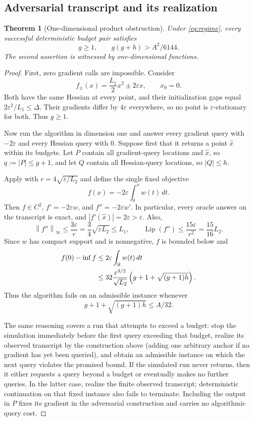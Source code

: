 \documentclass[11pt]{article}
\newtheorem{theorem}{Theorem}[section]
\theoremstyle{remark}
\theoremstyle{remark}
\newcommand{\R}{\mathbb R}
\newcommand{\eps}{\varepsilon}
\newcommand{\norm}[1]{\left\lVert#1\right\rVert}
\newcommand{\Lip}{\operatorname{Lip}}
\begin{document}
\subsection{Adversarial transcript and its realization}
\begin{theorem}[One-dimensional product obstruction]\label{thm:lower}
Under \eqref{eq:regime}, every successful deterministic budget pair satisfies
\[
 g\ge1,\qquad g(g+h)>A^2/6144.
\]
The second assertion is witnessed by one-dimensional functions.
\end{theorem}
\begin{proof}
First, zero gradient calls are impossible. Consider
\[
 f_\pm(x)=\frac{L_1}{2}x^2\pm2\eps x,\qquad x_0=0.
\]
Both have the same Hessian at every point, and their initialization gaps equal $2\eps^2/L_1\le\Delta$. Their gradients differ by $4\eps$ everywhere, so no point is $\eps$-stationary for both. Thus $g\ge1$.

Now run the algorithm in dimension one and answer every gradient query with $-2\eps$ and every Hessian query with $0$. Suppose first that it returns a point $\hat x$ within its budgets. Let $P$ contain all gradient-query locations and $\hat x$, so $q:=|P|\le g+1$, and let $Q$ contain all Hessian-query locations, so $|Q|\le h$.

Apply  with $r=4\sqrt{\eps/L_2}$ and define the single fixed objective
\begin{equation}\label{eq:hard-objective}
 f(x)=-2\eps\int_0^x w(t)\,dt.
\end{equation}
Then $f\in C^2$, $f'=-2\eps w$, and $f''=-2\eps w'$. In particular, every oracle answer on the transcript is exact, and $|f'(\hat x)|=2\eps>\eps$. Also,
\[
 \norm{f''}_\infty\le\frac{3\eps}{r}
 =\frac34\sqrt{\eps L_2}\le L_1,
 \qquad
 \Lip(f'')\le\frac{15\eps}{r^2}=\frac{15}{16}L_2.
\]
Since $w$ has compact support and is nonnegative, $f$ is bounded below and
\begin{align}
 f(0)-\inf f
 &\le2\eps\int_\R w(t)\,dt\notag\\
 &\le32\frac{\eps^{3/2}}{\sqrt{L_2}}
       \left(g+1+\sqrt{(g+1)h}\right).\label{eq:adversarial-gap}
\end{align}
Thus the algorithm fails on an admissible instance whenever
\begin{equation}\label{eq:budget-obstruction}
 g+1+\sqrt{(g+1)h}\le A/32.
\end{equation}

The same reasoning covers a run that attempts to exceed a budget: stop the simulation immediately before the first query exceeding that budget, realize its observed transcript by the construction above (adding one arbitrary anchor if no gradient has yet been queried), and obtain an admissible instance on which the next query violates the promised bound. If the simulated run never returns, then it either requests a query beyond a budget or eventually makes no further queries. In the latter case, realize the finite observed transcript; deterministic continuation on that fixed instance also fails to terminate. Including the output in $P$ fixes its gradient in the adversarial construction and carries no algorithmic query cost.


\end{proof}
\end{document}
